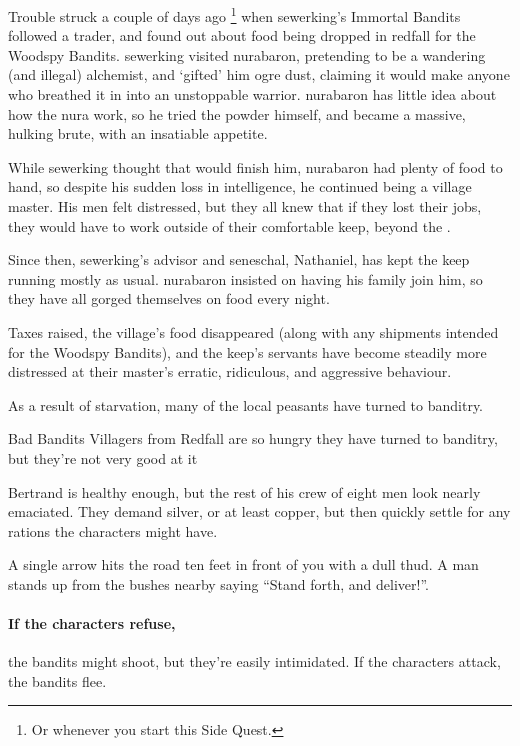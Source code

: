 \begin{multicols}{2}
Trouble struck a couple of days ago%
\footnote{Or whenever you start this Side Quest.}
when \gls{sewerking}'s Immortal Bandits followed a trader, and found out about food being dropped in \gls{redfall} for the Woodspy Bandits.
\Gls{sewerking} visited \gls{nurabaron}, pretending to be a wandering (and illegal) alchemist, and `gifted' him ogre dust, claiming it would make anyone who breathed it in into an unstoppable warrior.
\Gls{nurabaron} has little idea about how the nura work, so he tried the powder himself, and became a massive, hulking brute, with an insatiable appetite.

While \gls{sewerking} thought that would finish him, \gls{nurabaron} had plenty of food to hand, so despite his sudden loss in intelligence, he continued being a village master.
His men felt distressed, but they all knew that if they lost their jobs, they would have to work outside of their comfortable keep, beyond the .

Since then, \gls{sewerking}'s advisor and seneschal, Nathaniel, has kept the keep running mostly as usual.
\Gls{nurabaron} insisted on having his family join him, so they have all gorged themselves on food every night.

Taxes raised, the village's food disappeared (along with any shipments intended for the Woodspy Bandits), and the keep's servants have become steadily more distressed at their master's erratic, ridiculous, and aggressive behaviour.

As a result of starvation, many of the local peasants have turned to banditry.

{\N Bad Bandits}%
{Villagers from Redfall are so hungry they have turned to banditry, but they're not very good at it}%

Bertrand is healthy enough, but the rest of his crew of eight men look nearly emaciated.
They demand silver, or at least copper, but then quickly settle for any rations the characters might have.

\begin{boxtext}

  A single arrow hits the road ten feet in front of you with a dull thud.
  A man stands up from the bushes nearby saying ``Stand forth, and deliver!''.

\end{boxtext}

\paragraph{If the characters refuse,}
the bandits might shoot, but they're easily intimidated.  If the characters attack, the bandits flee.


\end{multicols}
